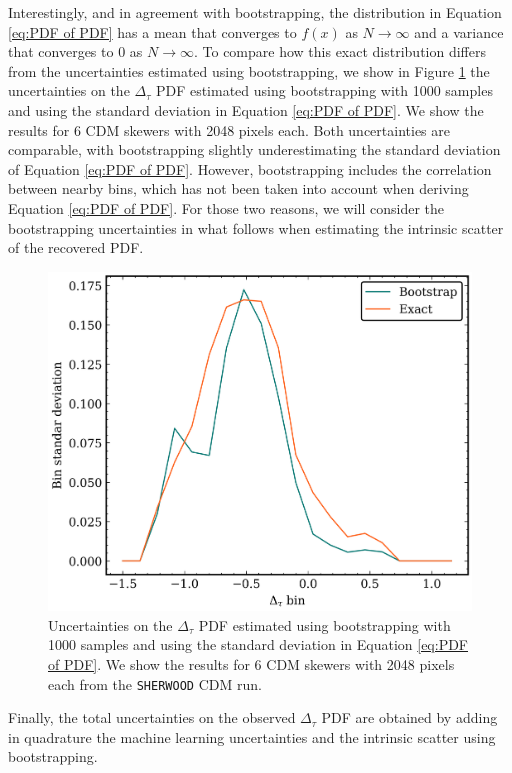 Interestingly, and in agreement with bootstrapping, the distribution in Equation \ref{eq:PDF of PDF} has a mean that converges to $f(x)$ as $N\to \infty$ and a variance that converges to 0 as $N\to \infty$. To compare how this exact distribution differs from the uncertainties estimated using bootstrapping, we show in Figure \ref{fig: boot vs exact} the uncertainties on the $\Delta_\tau$ PDF estimated using bootstrapping with 1000 samples and using the standard deviation in Equation \ref{eq:PDF of PDF}. We show the results for 6 CDM skewers with 2048 pixels each.
Both uncertainties are comparable, with bootstrapping slightly underestimating the standard deviation of Equation \ref{eq:PDF of PDF}. However, bootstrapping includes the correlation between nearby bins, which has not been taken into account when deriving Equation \ref{eq:PDF of PDF}. For those two reasons, we will consider the bootstrapping uncertainties in what follows when estimating the intrinsic scatter of the recovered PDF.
\begin{figure}
    \centering
    \includegraphics[width=0.85\linewidth]{img/ML/boot_vs_exxact.png}
    \caption{Uncertainties on the $\Delta_\tau$ PDF estimated using bootstrapping with 1000 samples and using the standard deviation in Equation \ref{eq:PDF of PDF}. We show the results for 6 CDM skewers with 2048 pixels each from the \texttt{SHERWOOD} CDM run.}
    \label{fig: boot vs exact}
\end{figure}

Finally, the total uncertainties on the observed $\Delta_\tau$ PDF are obtained by adding in quadrature the machine learning uncertainties and the intrinsic scatter using bootstrapping.

